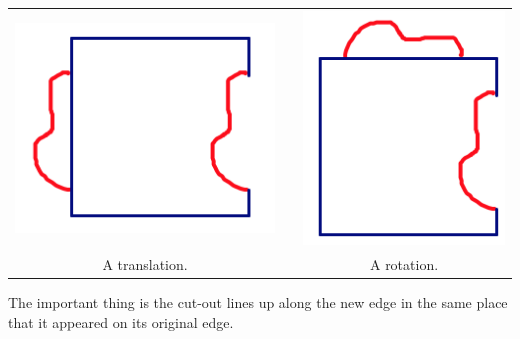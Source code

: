 \begin{enumerate}
\begin{center}
\begin{tabular}{ccc}
\includegraphics[scale=0.5]{eschdirect2} & \qquad\qquad& \includegraphics[scale=0.5]{eschdirect3}\\
A translation.  && A rotation.\\
\end{tabular}

\end{center}
The important thing is the cut-out lines up along the new edge in the same place that it appeared on its original edge.\\



\end{enumerate}

